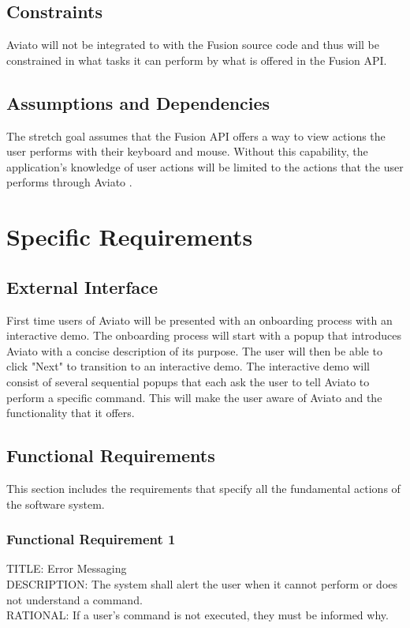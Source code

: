 \documentclass[onecolumn, draftclsnofoot,10pt, compsoc]{IEEEtran}
\def \botname{Aviato }
\begin{document}
    \subsection{Constraints}
        \botname will not be integrated to with the Fusion source code and thus will be constrained in what tasks it can perform by what is offered in the Fusion API. 

    \subsection{Assumptions and Dependencies}
        The stretch goal assumes that the Fusion API offers a way to view actions the user performs with their keyboard and mouse.
        Without this capability, the application's knowledge of user actions will be limited to the actions that the user performs through \botname.

\section{Specific Requirements}
    \subsection{External Interface}
       First time users of \botname will be presented with an onboarding process with an interactive demo.
       The onboarding process will start with a popup that introduces \botname with a concise description of its purpose.
       The user will then be able to click "Next" to transition to an interactive demo.
       The interactive demo will consist of several sequential popups that each ask the user to tell \botname to perform a specific command.
       This will make the user aware of \botname and the functionality that it offers.

    \subsection{Functional Requirements}
    This section includes the requirements that specify all the fundamental actions of the software system.
        \subsubsection{Functional Requirement 1}
        TITLE: Error Messaging \\
        DESCRIPTION: The system shall alert the user when it cannot perform or does not understand a command. \\
        RATIONAL: If a user's command is not executed, they must be informed why. 
        
\end{document}
